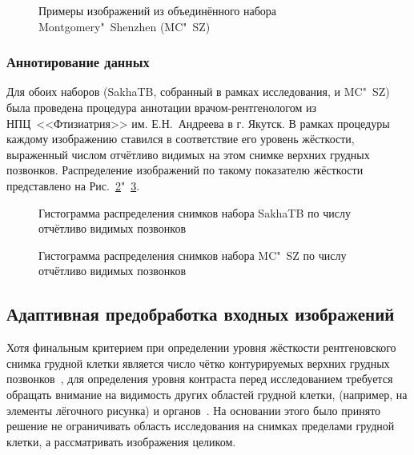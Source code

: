 \begin{figure}[ht]
	\caption{Примеры изображений из объединённого набора Montgomery"~Shenzhen (MC"~SZ)}
	\label{fig:samples-mc-sz}
\end{figure}

\subsubsection{Аннотирование данных}

Для обоих наборов (SakhaTB, собранный в рамках исследования, и MC"~SZ) была проведена процедура аннотации врачом-рентгенологом из НПЦ~<<Фтизиатрия>> им. Е.Н.~Андреева в г. Якутск. В рамках процедуры каждому изображению ставился в соответствие его уровень жёсткости, выраженный числом отчётливо видимых на этом снимке верхних грудных позвонков.  Распределение изображений по такому показателю жёсткости представлено на Рис.~\ref{fig:vertebrae-yak-hardness}"~\ref{fig:vertebrae-mc-sz}.

\begin{figure}[ht]
	\caption{Гистограмма распределения снимков набора SakhaTB по числу отчётливо видимых позвонков}
	\label{fig:vertebrae-yak-hardness}
\end{figure}

\begin{figure}[ht]
	\caption{Гистограмма распределения снимков набора MC"~SZ по числу отчётливо видимых позвонков}
	\label{fig:vertebrae-mc-sz}
\end{figure}

\subsection{Адаптивная предобработка входных изображений} \label{subsec:tb-hardness-preprocessing}

Хотя финальным критерием при определении уровня жёсткости рентгеновского снимка грудной клетки является число чётко контурируемых верхних грудных позвонков~\cite{тимофеева2013основные, сидоров2012методика}, для определения уровня контраста перед исследованием требуется обращать внимание на видимость других областей грудной клетки, (например, на элементы лёгочного рисунка) и органов~\cite{сидоров2012методика}. На основании этого было принято решение не ограничивать область исследования на снимках пределами грудной клетки, а рассматривать изображения целиком.


